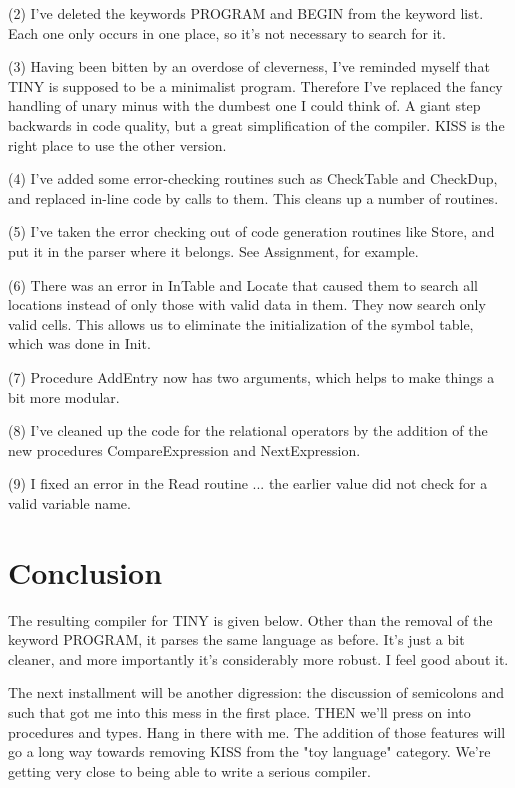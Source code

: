\documentclass[float=false, crop=false]{standalone}
\begin{document}
 (2)  I've  deleted  the  keywords  PROGRAM  and  BEGIN  from the
      keyword list.  Each  one  only occurs in one place, so it's
      not necessary to search for it.

 (3)  Having been  bitten  by  an  overdose  of  cleverness, I've
      reminded myself that TINY  is  supposed  to be a minimalist
      program.  Therefore I've  replaced  the  fancy  handling of
      unary minus with the dumbest one I could think of.  A giant
      step backwards in code quality, but a  great simplification
      of the compiler.  KISS is the right place to use  the other
      version.

 (4)  I've added some  error-checking routines such as CheckTable
      and CheckDup, and  replaced  in-line code by calls to them.
      This cleans up a number of routines.

 (5)  I've  taken  the  error  checking  out  of  code generation
      routines  like Store, and put it in  the  parser  where  it
      belongs.  See Assignment, for example.

 (6)  There was an error in InTable and Locate  that  caused them
      to search all locations  instead  of  only those with valid
      data  in them.  They now search only  valid  cells.    This
      allows us to eliminate  the  initialization  of  the symbol
      table, which was done in Init.

 (7)  Procedure AddEntry now has two  arguments,  which  helps to
      make things a bit more modular.

 (8)  I've cleaned up the  code  for  the relational operators by
      the addition of the  new  procedures  CompareExpression and
      NextExpression.

 (9)  I fixed an error in the Read routine ... the  earlier value
      did not check for a valid variable name.


 \section{Conclusion}

The resulting compiler for TINY is given below. Other than the removal of the
keyword PROGRAM, it parses the same language as before. It's just a bit cleaner,
and more importantly it's considerably more robust. I feel good about it.

The next installment will be another digression: the discussion of semicolons
and such that got me into this mess in the first place. THEN we'll press on into
procedures and types. Hang in there with me. The addition of those features will
go a long way towards removing KISS from the "toy language" category. We're
getting very close to being able to write a serious compiler.
\end{document}
